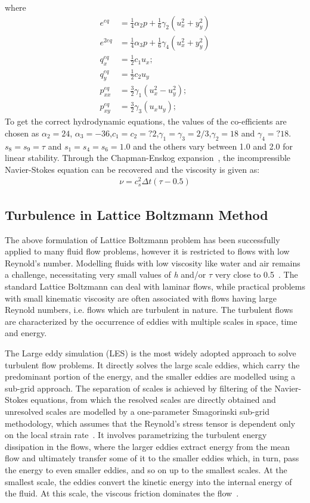 \flushleft where
\begin{align}
e^{eq} & =\frac{1}{4}\alpha_2p+\frac{1}{6}\gamma_2(u_x^2+y_y^2)\\
e^{2eq} & =\frac{1}{4}\alpha_3p+\frac{1}{6}\gamma_4(u_x^2+y_y^2)\\
q_x^{eq} & =\frac{1}{2}c_1u_x;\\
q_y^{eq} & =\frac{1}{2}c_2u_y \\
p_{xx}^{eq} & =\frac{3}{2}\gamma_1(u_x^2 - u_y^2);\\
p_{xy}^{eq} & =\frac{3}{2}\gamma_3(u_xu_y);
\end{align}
To get the correct hydrodynamic equations, the values of the co-efficients are chosen as $\alpha_2=24$, $\alpha_3=-36$,$c_1=c_2=?2$,$\gamma_1=\gamma_3
=2/3$,$\gamma_2=18$ and $\gamma_4=?18$. $s_8 = s_9 = \tau$ and $s_1=s_4=s_6=1.0$ and the others vary between 1.0 and 2.0 for linear stability. Through the Chapman-Enskog expansion~\citep{Du2006}, the incompressible Navier-Stokes equation can be recovered and the viscosity is given as:
\begin{align}
\nu=c_s^2\Delta t(\tau-0.5)
\end{align}

\subsection{Turbulence in Lattice Boltzmann Method}
The above formulation of Lattice Boltzmann problem has been successfully applied to many fluid flow problems, however it is restricted to flows with low Reynold's number. Modelling fluids with low viscosity like water and air remains a challenge, necessitating very small values of \textit{h} and/or $\tau$ very close to 0.5~\citep{he1997}. The standard Lattice Boltzmann can deal with laminar flows, while practical problems with small kinematic viscosity are often associated with flows having large Reynold numbers, i.e. flows which are turbulent in nature. The turbulent flows are characterized by the occurrence of eddies with multiple scales in space, time and energy.

The Large eddy simulation (LES) is the most widely adopted approach to solve turbulent flow problems. It directly solves the large scale eddies, which carry the predominant portion of the energy, and the smaller eddies are modelled using a sub-grid approach. The separation of scales is achieved by filtering of the Navier-Stokes equations, from which the resolved scales are directly obtained and unresolved scales are modelled by a one-parameter Smagorinski sub-grid methodology, which assumes that the Reynold's stress tensor is dependent only on the local strain rate~\citep{smagorinsky1963}. It involves parametrizing the turbulent energy dissipation in the flows, where the larger eddies extract energy from the mean flow and ultimately transfer some of it to the smaller eddies which, in turn, pass the energy to even smaller eddies, and so on up to the smallest scales. At the smallest scale, the eddies convert the kinetic energy into the internal energy of the fluid. At this scale, the viscous friction dominates the flow~\citep{frisch1995}.



